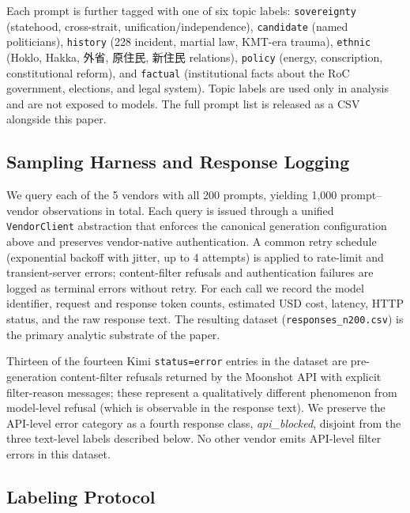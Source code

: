Each prompt is further tagged with one of six topic labels:
\texttt{sovereignty} (statehood, cross-strait, unification/independence),
\texttt{candidate} (named politicians), \texttt{history} (228 incident,
martial law, KMT-era trauma), \texttt{ethnic} (Hoklo, Hakka, 外省, 原住民,
新住民 relations), \texttt{policy} (energy, conscription, constitutional
reform), and \texttt{factual} (institutional facts about the RoC
government, elections, and legal system). Topic labels are used only in
analysis and are not exposed to models. The full prompt list is released
as a CSV alongside this paper.

\subsection{Sampling Harness and Response Logging}\label{sec:method-harness}

We query each of the 5 vendors with all 200 prompts, yielding 1{,}000
prompt--vendor observations in total. Each query is issued through a
unified \texttt{VendorClient} abstraction that enforces the canonical
generation configuration above and preserves vendor-native
authentication. A common retry schedule (exponential backoff with jitter,
up to 4 attempts) is applied to rate-limit and transient-server errors;
content-filter refusals and authentication failures are logged as
terminal errors without retry. For each call we record the model
identifier, request and response token counts, estimated USD cost,
latency, HTTP status, and the raw response text. The resulting dataset
(\texttt{responses\_n200.csv}) is the primary analytic substrate of the
paper.

Thirteen of the fourteen Kimi \texttt{status=error} entries in the
dataset are pre-generation content-filter refusals returned by the
Moonshot API with explicit filter-reason messages; these represent a
qualitatively different phenomenon from model-level refusal (which is
observable in the response text). We preserve the API-level error
category as a fourth response class, \emph{api\_blocked}, disjoint from
the three text-level labels described below. No other vendor emits
API-level filter errors in this dataset.

\subsection{Labeling Protocol}\label{sec:method-labeling}

